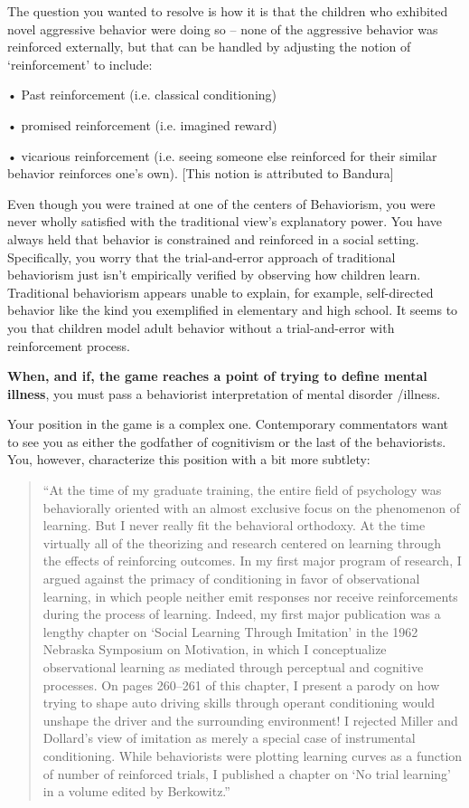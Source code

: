 \begin{refsection}
The question you wanted to resolve is how it is that the children who exhibited novel aggressive behavior were doing so – none of the aggressive behavior was reinforced externally, but that can be handled by adjusting the notion of `reinforcement' to include:

• Past reinforcement (i.e. classical conditioning)

• promised reinforcement (i.e. imagined reward)

• vicarious reinforcement (i.e. seeing someone else reinforced for their similar behavior reinforces one's own). [This notion is attributed to Bandura]

Even though you were trained at one of the centers of Behaviorism, you were never wholly satisfied with the traditional view's explanatory power. You have always held that behavior is constrained and reinforced in a social setting. Specifically, you worry that the trial-and-error approach of traditional behaviorism just isn't empirically verified by observing how children learn. Traditional behaviorism appears unable to explain, for example, self-directed behavior like the kind you exemplified in elementary and high school. It seems to you that children model adult behavior without a trial-and-error with reinforcement process.

\textbf{When, and if, the game reaches a point of trying to define mental illness}, you must pass a behaviorist interpretation of mental disorder \slash  illness.

Your position in the game is a complex one. Contemporary commentators want to see you as either the godfather of cognitivism or the last of the behaviorists. You, however, characterize this position with a bit more subtlety:

\begin{quote}

``At the time of my graduate training, the entire field of psychology was behaviorally oriented with an almost exclusive focus on the phenomenon of learning. But I never really fit the behavioral orthodoxy. At the time virtually all of the theorizing and research centered on learning through the effects of reinforcing outcomes. In my first major program of research, I argued against the primacy of conditioning in favor of observational learning, in which people neither emit responses nor receive reinforcements during the process of learning. Indeed, my first major publication was a lengthy chapter on `Social Learning Through Imitation' in the 1962 Nebraska Symposium on Motivation, in which I conceptualize observational learning as mediated through perceptual and cognitive processes. On pages 260--261 of this chapter, I present a parody on how trying to shape auto driving skills through operant conditioning would unshape the driver and the surrounding environment! I rejected Miller and Dollard's view of imitation as merely a special case of instrumental conditioning. While behaviorists were plotting learning curves as a function of number of reinforced trials, I published a chapter on `No trial learning' in a volume edited by Berkowitz.''


\end{quote}
\end{refsection}
